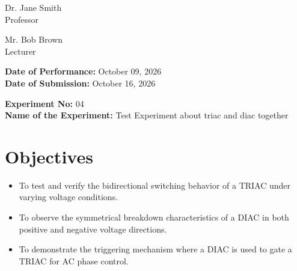 \documentclass[12pt,a4paper]{article}
\begin{document}
\begin{titlepage}
\begin{minipage}[t]{0.5\textwidth}
\begin{flushright}
            Dr. Jane Smith \\
            Professor \\
            \vspace{0.3cm}
            
            Mr. Bob Brown \\
            Lecturer \\
            
            
        \end{flushright}
    \end{minipage}

    \vfill
    \textbf{Date of Performance:} October 09, 2026 \\
    \textbf{Date of Submission:} October 16, 2026
    
\end{titlepage}

\setcounter{page}{1}
\rmfamily %
\normalsize

\begin{center}
    \textbf{Experiment No:} 04 \\
    \vspace{0.2cm}
    \textbf{Name of the Experiment:} Test Experiment about triac and diac together
\end{center}
\vspace{0.5cm}


\section{Objectives}
\begin{itemize}

    \item To test and verify the bidirectional switching behavior of a TRIAC under varying voltage conditions.

    \item To observe the symmetrical breakdown characteristics of a DIAC in both positive and negative voltage directions.

    \item To demonstrate the triggering mechanism where a DIAC is used to gate a TRIAC for AC phase control.

\end{itemize}
\end{document}
